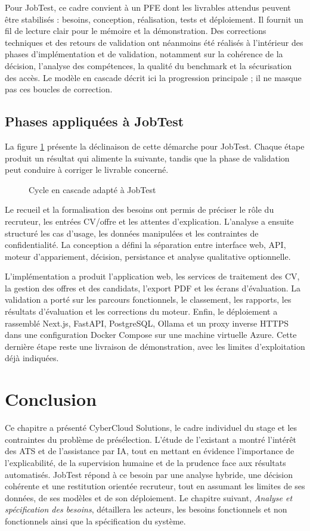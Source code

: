 Pour JobTest, ce cadre convient à un PFE dont les livrables attendus peuvent être stabilisés : besoins, conception, réalisation, tests et déploiement. Il fournit un fil de lecture clair pour le mémoire et la démonstration. Des corrections techniques et des retours de validation ont néanmoins été réalisés à l'intérieur des phases d'implémentation et de validation, notamment sur la cohérence de la décision, l'analyse des compétences, la qualité du benchmark et la sécurisation des accès. Le modèle en cascade décrit ici la progression principale ; il ne masque pas ces boucles de correction.

\subsection{Phases appliquées à JobTest}
La figure \ref{fig:waterfall-jobtest} présente la déclinaison de cette démarche pour JobTest. Chaque étape produit un résultat qui alimente la suivante, tandis que la phase de validation peut conduire à corriger le livrable concerné.

\begin{figure}[htbp]
  \centering
  
  \caption{Cycle en cascade adapté à JobTest}
  \label{fig:waterfall-jobtest}
\end{figure}

Le recueil et la formalisation des besoins ont permis de préciser le rôle du recruteur, les entrées CV/offre et les attentes d'explication. L'analyse a ensuite structuré les cas d'usage, les données manipulées et les contraintes de confidentialité. La conception a défini la séparation entre interface web, API, moteur d'appariement, décision, persistance et analyse qualitative optionnelle.

L'implémentation a produit l'application web, les services de traitement des CV, la gestion des offres et des candidats, l'export PDF et les écrans d'évaluation. La validation a porté sur les parcours fonctionnels, le classement, les rapports, les résultats d'évaluation et les corrections du moteur. Enfin, le déploiement a rassemblé Next.js, FastAPI, PostgreSQL, Ollama et un proxy inverse HTTPS dans une configuration Docker Compose sur une machine virtuelle Azure. Cette dernière étape reste une livraison de démonstration, avec les limites d'exploitation déjà indiquées.

\section*{Conclusion}
Ce chapitre a présenté CyberCloud Solutions, le cadre individuel du stage et les contraintes du problème de présélection. L'étude de l'existant a montré l'intérêt des ATS et de l'assistance par IA, tout en mettant en évidence l'importance de l'explicabilité, de la supervision humaine et de la prudence face aux résultats automatisés. JobTest répond à ce besoin par une analyse hybride, une décision cohérente et une restitution orientée recruteur, tout en assumant les limites de ses données, de ses modèles et de son déploiement. Le chapitre suivant, \emph{Analyse et spécification des besoins}, détaillera les acteurs, les besoins fonctionnels et non fonctionnels ainsi que la spécification du système.
